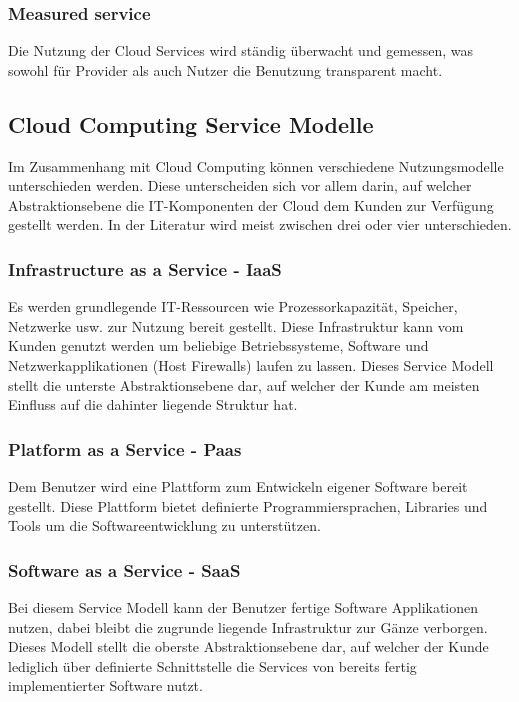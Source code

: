 \documentclass{report}
\begin{document}
\subsubsection{Measured service}
Die Nutzung der Cloud Services wird ständig überwacht und gemessen, was sowohl für Provider als auch Nutzer die Benutzung transparent macht.

\subsection{Cloud Computing Service Modelle}
Im Zusammenhang mit Cloud Computing können verschiedene Nutzungsmodelle unterschieden werden. Diese unterscheiden sich vor allem darin, auf welcher Abstraktionsebene die IT-Komponenten der Cloud dem Kunden zur Verfügung gestellt werden. In der Literatur wird meist zwischen drei oder vier unterschieden.

\subsubsection{Infrastructure as a Service - IaaS}
Es werden grundlegende IT-Ressourcen wie Prozessorkapazität, Speicher, Netzwerke usw. zur Nutzung bereit gestellt. Diese Infrastruktur kann vom Kunden genutzt werden um beliebige Betriebssysteme, Software und Netzwerkapplikationen (Host Firewalls) laufen zu lassen. Dieses Service Modell stellt die unterste Abstraktionsebene dar, auf welcher der Kunde am meisten Einfluss auf die dahinter liegende Struktur hat.

\subsubsection{Platform as a Service - Paas}
Dem Benutzer wird eine Plattform zum Entwickeln eigener Software bereit gestellt. Diese Plattform bietet definierte Programmiersprachen, Libraries und Tools um die Softwareentwicklung zu unterstützen.

\subsubsection{Software as a Service - SaaS}
Bei diesem Service Modell kann der Benutzer fertige Software Applikationen nutzen, dabei bleibt die zugrunde liegende Infrastruktur zur Gänze verborgen. Dieses Modell stellt die oberste Abstraktionsebene dar, auf welcher der Kunde lediglich über definierte Schnittstelle die Services von bereits fertig implementierter Software nutzt.
\end{document}
